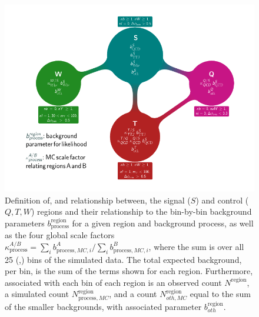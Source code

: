 \begin{figure}[p]
  \centering
  \includegraphics[width=\textwidth]{figures/razor_strategy/BoostFlowChart_noZ}
  \caption{Definition of, and relationship between, the signal ($S$) and control ($Q,T,W$) regions
and their relationship to the bin-by-bin background parameters
$b^{\textrm{region}}_{\textrm{process}}$ for a given region and background process, as well as the
four global scale factors $\kappa^{A/B}_{\textrm{process}} = \sum_i b^A_{\textrm{process}, MC, i} /
\sum_i b^B_{\textrm{process}, MC, i}$, where the sum is over all 25 (\mr,\rsq) bins of the simulated
data. 
The total expected background, per bin, is the sum of the terms shown for each region. Furthermore,
associated with each bin of each region is an observed count $N^{\textrm{region}}$, a simulated
count $N^{\textrm{region}}_{\textrm{process}, MC}$, and a count $N^{\textrm{region}}_{oth, MC}$
equal to the sum of the smaller backgrounds, with associated parameter $b^{\textrm{region}}_{oth}$.
  \label{fig:boost_flowchart}}
\end{figure}
